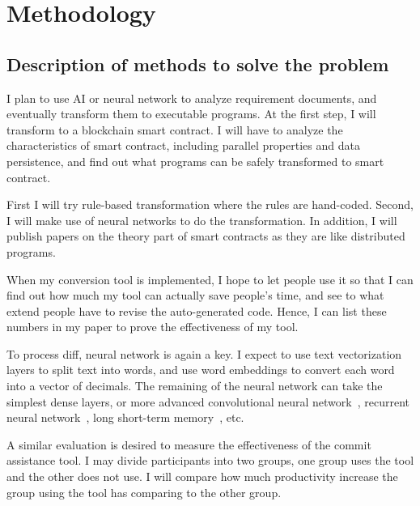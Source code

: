 \chapter{Methodology}


\section{Description of methods to solve the problem}

I plan to use AI or neural network to analyze requirement documents, and eventually transform them to executable programs.
At the first step, I will transform to a blockchain smart contract.
I will have to analyze the characteristics of smart contract, including parallel properties and data persistence, and find out what programs can be safely transformed to smart contract.

First I will try rule-based transformation where the rules are hand-coded. Second, I will make use of neural networks to do the transformation. In addition, I will publish papers on the theory part of smart contracts as they are like distributed programs.

When my conversion tool is implemented, I hope to let people use it so that I can find out how much my tool can actually save people's time, and see to what extend people have to revise the auto-generated code. Hence, I can list these numbers in my paper to prove the effectiveness of my tool.


To process diff, neural network is again a key. I expect to use text vectorization layers to split text into words, and use word embeddings to convert each word into a vector of decimals.
The remaining of the neural network can take the simplest dense layers, or more advanced convolutional neural network~\cite{albawi2017understanding}, recurrent neural network~\cite{tarwani2017survey}, long short-term memory~\cite{skovajsova2017long}, etc.

A similar evaluation is desired to measure the effectiveness of the commit assistance tool. I may divide participants into two groups, one group uses the tool and the other does not use. I will compare how much productivity increase the group using the tool has comparing to the other group.


